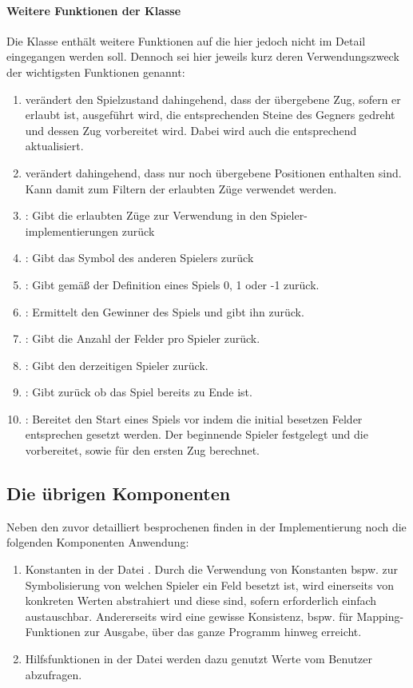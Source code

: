 \paragraph{Weitere Funktionen der Klasse }
Die Klasse  enthält weitere Funktionen auf die hier jedoch nicht im Detail eingegangen werden soll. Dennoch sei hier jeweils kurz deren Verwendungszweck der wichtigsten Funktionen genannt:
\begin{enumerate}
\item {} verändert den Spielzustand dahingehend, dass der übergebene Zug, sofern er erlaubt ist, ausgeführt wird, die entsprechenden Steine des Gegners gedreht und dessen Zug vorbereitet wird. Dabei wird auch die  entsprechend aktualisiert.
\item {} verändert  dahingehend, dass nur noch übergebene Positionen enthalten sind. Kann damit zum Filtern der erlaubten Züge verwendet werden.
\item {}: Gibt die erlaubten Züge zur Verwendung in den Spieler-\\implementierungen zurück
\item {}: Gibt das Symbol des anderen Spielers zurück
\item {}: Gibt gemäß der Definition eines Spiels 0, 1 oder -1 zurück.
\item {}: Ermittelt den Gewinner des Spiels und gibt ihn zurück.
\item {}: Gibt die Anzahl der Felder pro Spieler zurück.
\item {}: Gibt den derzeitigen Spieler zurück.
\item {}: Gibt zurück ob das Spiel bereits zu Ende ist.
\item {}: Bereitet den Start eines Spiels vor indem die initial besetzen Felder entsprechen gesetzt werden. Der beginnende Spieler festgelegt und die   vorbereitet, sowie  für den ersten Zug berechnet.
\end{enumerate}
\subsection{Die übrigen Komponenten}
Neben den zuvor detailliert besprochenen finden in der Implementierung noch die folgenden Komponenten Anwendung: 
\begin{enumerate}
\item Konstanten in der Datei . Durch die Verwendung von Konstanten bspw. zur Symbolisierung von welchen Spieler ein Feld besetzt ist, wird einerseits von konkreten Werten abstrahiert und diese sind, sofern erforderlich einfach austauschbar. Andererseits wird eine gewisse Konsistenz, bspw. für Mapping-Funktionen zur Ausgabe, über das ganze Programm hinweg erreicht.
\item Hilfsfunktionen in der Datei  werden dazu genutzt Werte vom Benutzer abzufragen.
\end{enumerate}

